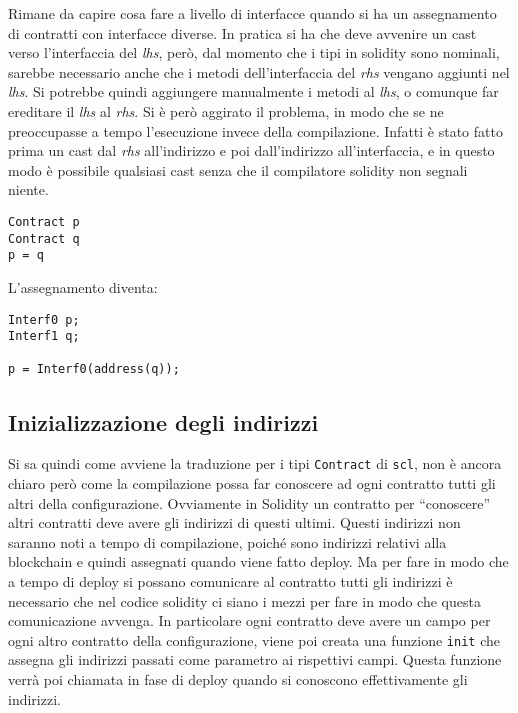 \documentclass[]{article}
\begin{document}
Rimane da capire cosa fare a livello di interfacce quando si ha un
assegnamento di contratti con interfacce diverse. In pratica si ha che
deve avvenire un cast verso l'interfaccia del \emph{lhs}, però, dal
momento che i tipi in solidity sono nominali, sarebbe necessario anche
che i metodi dell'interfaccia del \emph{rhs} vengano aggiunti nel
\emph{lhs}. Si potrebbe quindi aggiungere manualmente i metodi al
\emph{lhs}, o comunque far ereditare il \emph{lhs} al \emph{rhs}. Si è
però aggirato il problema, in modo che se ne preoccupasse a tempo
l'esecuzione invece della compilazione. Infatti è stato fatto prima un
cast dal \emph{rhs} all'indirizzo e poi dall'indirizzo all'interfaccia,
e in questo modo è possibile qualsiasi cast senza che il compilatore
solidity non segnali niente.

\begin{verbatim}
Contract p
Contract q
p = q
\end{verbatim}

L'assegnamento diventa:

\begin{verbatim}
Interf0 p;
Interf1 q;

p = Interf0(address(q));
\end{verbatim}

\hypertarget{inizializzazione-degli-indirizzi}{%
\subsection{Inizializzazione degli
indirizzi}\label{inizializzazione-degli-indirizzi}}

Si sa quindi come avviene la traduzione per i tipi \texttt{Contract} di
\texttt{scl}, non è ancora chiaro però come la compilazione possa far
conoscere ad ogni contratto tutti gli altri della configurazione.
Ovviamente in Solidity un contratto per ``conoscere'' altri contratti
deve avere gli indirizzi di questi ultimi. Questi indirizzi non saranno
noti a tempo di compilazione, poiché sono indirizzi relativi alla
blockchain e quindi assegnati quando viene fatto deploy. Ma per fare in
modo che a tempo di deploy si possano comunicare al contratto tutti gli
indirizzi è necessario che nel codice solidity ci siano i mezzi per fare
in modo che questa comunicazione avvenga. In particolare ogni contratto
deve avere un campo per ogni altro contratto della configurazione, viene
poi creata una funzione \texttt{init} che assegna gli indirizzi passati
come parametro ai rispettivi campi. Questa funzione verrà poi chiamata
in fase di deploy quando si conoscono effettivamente gli indirizzi.
\end{document}
